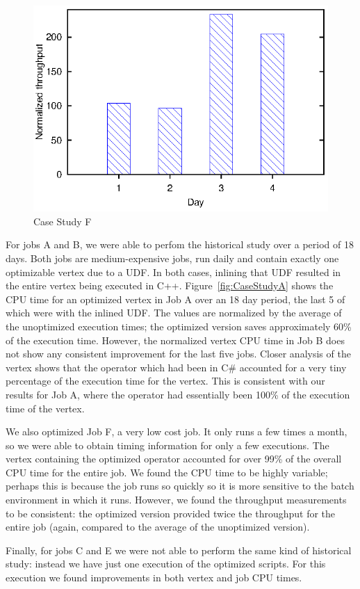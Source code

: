 \begin{figure}[ht]
\includegraphics{graphs/throughtputF}
\caption{Case Study F \label{fig:CaseStudyF}}
\end{figure}


For jobs A and B, we were able to perfom the historical study over a period of 18 days. 
Both jobs are medium-expensive jobs, run daily and contain exactly one optimizable vertex due to a UDF. In both cases, inlining that UDF resulted in the entire vertex being executed in C++.
Figure~\ref{fig:CaseStudyA} shows the CPU time for an optimized vertex in Job A over an 18 day period, the last 5 of which were with the inlined UDF.
The values are normalized by the average of the unoptimized execution times; the optimized version saves approximately 60\% of the execution time.
However, the normalized vertex CPU time in Job B does not show any consistent improvement for the last five jobs.
Closer analysis of the vertex shows that the operator which had been in C\# accounted for a very tiny percentage of the execution time for the vertex.
This is consistent with our results for Job A, where the operator had essentially been 100\% of the execution time of the vertex.


We also optimized Job F, a very low cost job.
It only runs a few times a month, so we were able to obtain timing information for only a few executions.
The vertex containing the optimized operator accounted for over 99\% of the overall CPU time for the entire job.
We found the CPU time to be highly variable; perhaps this is because the job runs so quickly so it is more sensitive to the batch environment in which it runs.
However,  we found the throughput measurements to be consistent: the optimized version provided twice the throughput for the entire job (again, compared to the average of the unoptimized version).

Finally, for jobs C and E we were not able to perform the same kind of historical study: instead we have just one execution of the optimized scripts. 
For this execution we found improvements in both vertex and job CPU times.


